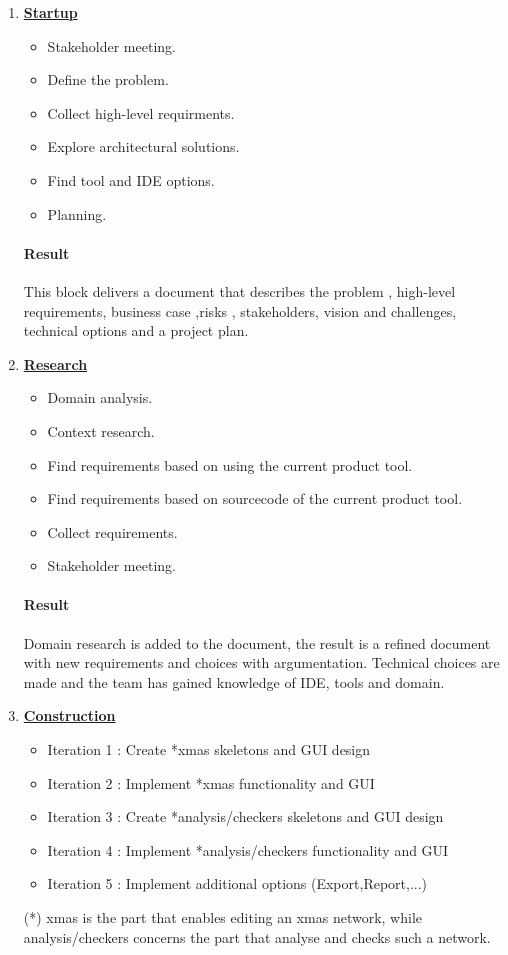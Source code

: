 \begin{enumerate}
	\item \underline{\textbf{Startup}}
	\begin{itemize}
		\item Stakeholder meeting.
		\item Define the problem.
		\item Collect high-level requirments.
		\item Explore architectural solutions.
		\item Find tool and IDE options.
		\item Planning. 
	\end{itemize}
	\paragraph{Result}
	This block delivers a document that describes the problem , high-level requirements, business case ,risks , stakeholders, vision and challenges, technical options and a project plan.
	
	\item \underline{\textbf{Research}}
	\begin{itemize}
		\item Domain analysis.
		\item Context research.
		\item Find requirements based on using the current product tool.
		\item Find requirements based on sourcecode of the current product tool.
		\item Collect requirements.
		\item Stakeholder meeting.
	\end{itemize}
	\paragraph{Result}
	Domain research is added to the document, the result is a refined document with new requirements and choices with argumentation. Technical choices are made and the team has gained knowledge of IDE, tools and domain. 
	
	\item \underline{\textbf{Construction}}
	
	\begin{itemize}
		\item Iteration 1 :
		Create *xmas skeletons and GUI design
		\item Iteration 2 :
		Implement *xmas functionality and GUI
		\item Iteration 3 :
		Create *analysis/checkers skeletons and GUI design
		\item Iteration 4 :
		Implement *analysis/checkers functionality and GUI
		\item Iteration 5 :
		Implement additional options (Export,Report,...)
	\end{itemize}
	(*) xmas is the part that enables editing an xmas network, while analysis/checkers concerns the part that analyse and checks such a network.
	

\end{enumerate}
